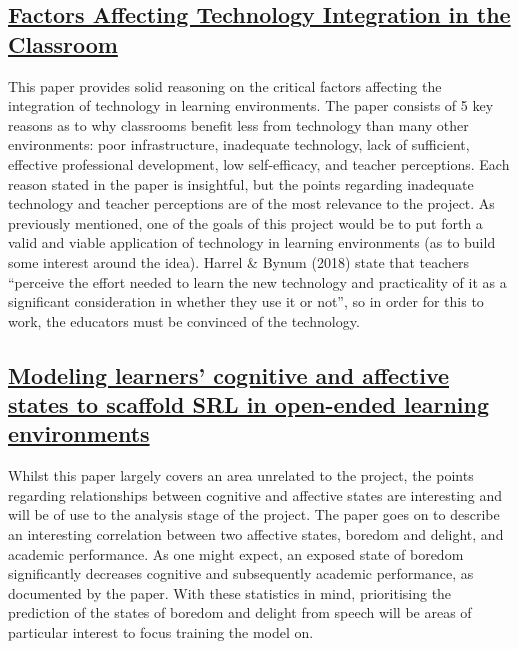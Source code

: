 \documentclass[12pt]{article}
\begin{document}
\subsection{\href{https://files.eric.ed.gov/fulltext/EJ1194723.pdf}{Factors Affecting Technology Integration in the Classroom}}
This paper provides solid reasoning on the critical factors affecting the integration of technology in learning environments. The paper consists of 5 key reasons as to why classrooms benefit less from technology than many other environments: poor infrastructure, inadequate technology, lack of sufficient, effective professional development, low self-efficacy, and teacher perceptions. Each reason stated in the paper is insightful, but the points regarding inadequate technology and teacher perceptions are of the most relevance to the project. As previously mentioned, one of the goals of this project would be to put forth a valid and viable application of technology in learning environments (as to build some interest around the idea). Harrel \& Bynum (2018) state that teachers ``perceive the effort needed to learn the new technology and practicality of it as a significant consideration in whether they use it or not'', so in order for this to work, the educators must be convinced of the technology.

\subsection{\href{https://www.researchgate.net/profile/Ryan-Baker-2/publication/326217846_Modeling_Learners'_Cognitive_and_Affective_States_to_Scaffold_SRL_in_Open-Ended_Learning_Environments/links/5b560a4245851507a7c3f516/Modeling-Learners-Cognitive-and-Affective-States-to-Scaffold-SRL-in-Open-Ended-Learning-Environments.pdf}{Modeling learners' cognitive and affective states to scaffold SRL in open-ended learning environments}}
Whilst this paper largely covers an area unrelated to the project, the points regarding relationships between cognitive and affective states are interesting and will be of use to the analysis stage of the project. The paper goes on to describe an interesting correlation between two affective states, boredom and delight, and academic performance. As one might expect, an exposed state of boredom significantly decreases cognitive and subsequently academic performance, as documented by the paper. With these statistics in mind, prioritising the prediction of the states of boredom and delight from speech will be areas of particular interest to focus training the model on.
\end{document}
